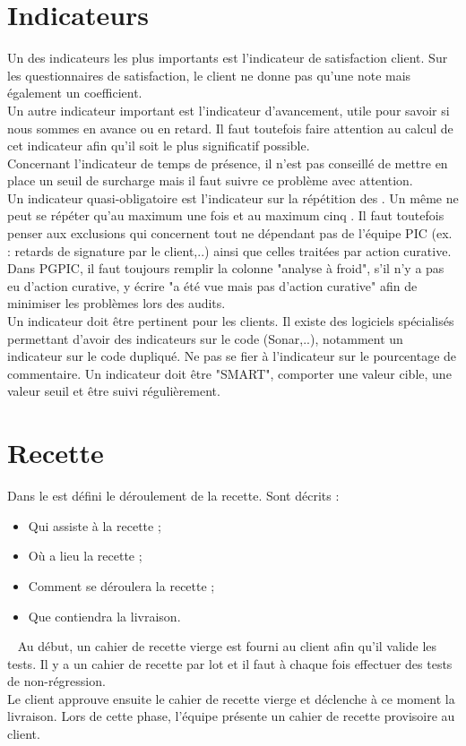 \documentclass [a4paper] {article}
\begin{document}
\section{Indicateurs}
Un des indicateurs les plus importants est l'indicateur de satisfaction client. Sur les questionnaires de satisfaction, le client ne donne pas qu'une note mais également un coefficient.
\\
Un autre indicateur important est l'indicateur d'avancement, utile pour savoir si nous sommes en avance ou en retard. Il faut toutefois faire attention au calcul de cet indicateur afin qu'il soit le plus significatif possible.
\\
Concernant l'indicateur de temps de présence, il n'est pas conseillé de mettre en place un seuil de surcharge mais il faut suivre ce problème avec attention.
\\
Un indicateur quasi-obligatoire est l'indicateur sur la répétition des \FTCourt{}. Un même \FT{} ne peut se répéter qu'au maximum une fois et au maximum cinq \FTCourt{}. Il faut toutefois penser aux exclusions qui concernent tout \FTCourt{} ne dépendant pas de l'équipe PIC (ex. : retards de signature par le client,..) ainsi que celles traitées par action curative. Dans PGPIC, il faut toujours remplir la colonne "analyse à froid", s'il n'y a pas eu d'action curative, y écrire "a été vue mais pas d'action curative" afin de minimiser les problèmes lors des audits.
\\
Un indicateur doit être pertinent pour les clients. Il existe des logiciels spécialisés permettant d'avoir des indicateurs sur le code (Sonar,..), notamment un indicateur sur le code dupliqué. Ne pas se fier à l'indicateur sur le pourcentage de commentaire. Un indicateur doit être "SMART", comporter une valeur cible, une valeur seuil et être suivi régulièrement.

\section{Recette}

Dans le \PTV{} est défini le déroulement de la recette. Sont décrits :
\begin{itemize}
\item Qui assiste à la recette ;
\item Où a lieu la recette ;
\item Comment se déroulera la recette ;
\item Que contiendra la livraison.
\end{itemize}
~
Au début, un cahier de recette vierge est fourni au client afin qu'il valide les tests. Il y a un cahier de recette par lot et il faut à chaque fois effectuer des tests de non-régression.
\\
Le client approuve ensuite le cahier de recette vierge et déclenche à ce moment la livraison. Lors de cette phase, l'équipe présente un cahier de recette provisoire au client.
\end{document}
